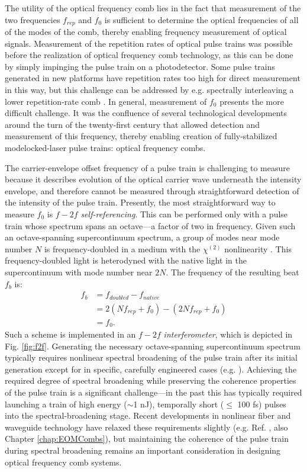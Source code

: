 The utility of the optical frequency comb lies in the fact that measurement of the two frequencies $f_{rep}$ and $f_0$ is sufficient to determine the optical frequencies of all of the modes of the comb, thereby enabling frequency measurement of optical signals. Measurement of the repetition rates of optical pulse trains was possible before the realization of optical frequency comb technology, as this can be done by simply impinging the pulse train on a photodetector. Some pulse trains generated in new platforms have repetition rates too high for direct measurement in this way, but this challenge can be addressed by e.g. spectrally interleaving a lower repetition-rate comb \cite{Spencer2018,Briles2017}. In general, measurement of $f_0$ presents the more difficult challenge. It was the confluence of several technological developments around the turn of the twenty-first century that allowed detection and measurement of this frequency, thereby enabling creation of fully-stabilized modelocked-laser pulse trains: optical frequency combs.

The carrier-envelope offset frequency of a pulse train is challenging to measure because it describes evolution of the optical carrier wave underneath the intensity envelope, and therefore cannot be measured through straightforward detection of the intensity of the pulse train. Presently, the most straightforward way to measure $f_0$ is $f-2f$ \textit{self-referencing}. This can be performed only with a pulse train whose spectrum spans an octave---a factor of two in frequency. Given such an octave-spanning supercontinuum spectrum, a group of modes near mode number $N$ is frequency-doubled in a medium with the $\chi^{(2)}$ nonlinearity \cite{Boyd2003}. This frequency-doubled light is heterodyned with the native light in the supercontinuum with mode number near $2N$. The frequency of the resulting beat $f_b$ is:
\begin{align}
f_b&=f_{doubled}-f_{native}\\
&=2(Nf_{rep}+f_0)-(2Nf_{rep}+f_0)\\
&=f_0.
\end{align}
Such a scheme is implemented in an $f-2f$ \textit{interferometer}, which is depicted in Fig. \ref{fig:f2f}. Generating the necessary octave-spanning supercontinuum spectrum typically requires nonlinear spectral broadening of the pulse train after its initial generation except for in specific, carefully engineered cases (e.g. \cite{Briles2017,Fortier2003}). Achieving the required degree of spectral broadening while preserving the coherence properties of the pulse train is a significant challenge---in the past this has typically required launching a train of high energy ($\sim$1 nJ), temporally short ($\leq$ 100 fs) pulses into the spectral-broadening stage. Recent developments in nonlinear fiber and waveguide technology have relaxed these requirements slightly (e.g. Ref. \cite{Carlson2017}, also Chapter \ref{chap:EOMCombs}), but maintaining the coherence of the pulse train during spectral broadening remains an important consideration in designing optical frequency comb systems. 

